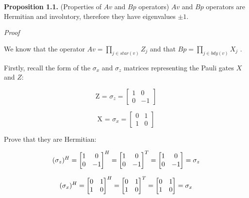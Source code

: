 \documentclass[12pt]{report}
\begin{document}
	\begin{minipage}{1\textwidth}
		
		
	    
	    \textbf{Proposition 1.1.} (Properties of $Av$ and $Bp$ operators) $Av$ and $Bp$ operators are Hermitian and involutory, therefore they have eigenvalues $\pm 1$.
	    \newline
	
     	\textit{Proof}\newline
     	
     	We know that the operator $ Av = \prod_{j \in star(v)} Z_j $ and that $ Bp = \prod_{j \in bdy(v)} X_j $ .\newline
     	
     	Firstly, recall the form of the $\sigma_x$ and $\sigma_z$ matrices representing the Pauli gates $X$ and $Z$:
	
	
	    
	    \[
	    \text{Z = $\sigma_z$} =
	    \begin{bmatrix}
	    	1 & 0 \\
	    	0 & -1
	    \end{bmatrix}
	    \]
	    
	 
	    \[
	    \text{X = $\sigma_x$} =
	    \begin{bmatrix}
	    	0 & 1 \\
	    	1 & 0
	    \end{bmatrix}
	    \]
	    
	    
	    Prove that they are Hermitian:\newline
	    
	    \[
	    \text{$( \sigma_z )^{H}$} = 
	    \begin{bmatrix}
	    	1 & 0 \\
	    	0 & -1
	    \end{bmatrix} ^H =
	    \begin{bmatrix}
	    	1 & 0 \\
	    	0 & -1
	    \end{bmatrix}^T =
	    \begin{bmatrix}
	    	1 & 0 \\
	    	0 & -1
	    \end{bmatrix}
	    = \text{$ \sigma_z $}
	    \]
	    
	    
	    \[
	    \text{$( \sigma_x )^{H}$} = 
	    \begin{bmatrix}
	    	0 & 1 \\
	    	1 & 0
	    \end{bmatrix} ^H =
	    \begin{bmatrix}
	    	0 & 1 \\
	    	1 & 0
	    \end{bmatrix}^T =
	    \begin{bmatrix}
	    	0 & 1 \\
	    	1 & 0
	    \end{bmatrix}
	    = \text{$ \sigma_x $}
	    \]\newline
	    

\end{minipage}
\end{document}
